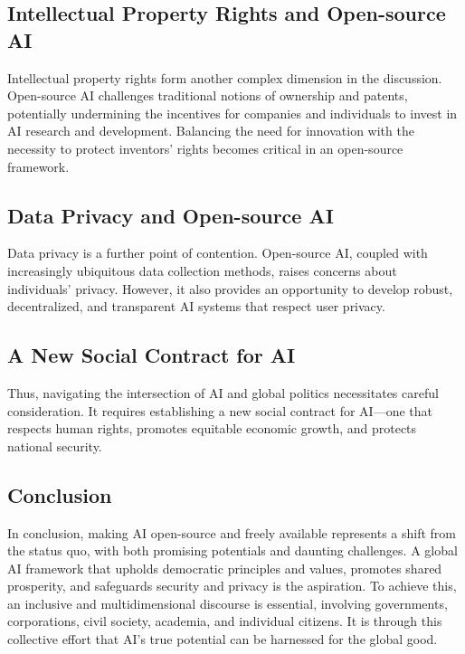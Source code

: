 \subsection{Intellectual Property Rights and Open-source AI}
Intellectual property rights form another complex dimension in the discussion. Open-source AI challenges traditional notions of ownership and patents, potentially undermining the incentives for companies and individuals to invest in AI research and development. Balancing the need for innovation with the necessity to protect inventors' rights becomes critical in an open-source framework.

\subsection{Data Privacy and Open-source AI}
Data privacy is a further point of contention. Open-source AI, coupled with increasingly ubiquitous data collection methods, raises concerns about individuals' privacy. However, it also provides an opportunity to develop robust, decentralized, and transparent AI systems that respect user privacy.

\subsection{A New Social Contract for AI}
Thus, navigating the intersection of AI and global politics necessitates careful consideration. It requires establishing a new social contract for AI—one that respects human rights, promotes equitable economic growth, and protects national security.

\subsection{Conclusion}
In conclusion, making AI open-source and freely available represents a shift from the status quo, with both promising potentials and daunting challenges. A global AI framework that upholds democratic principles and values, promotes shared prosperity, and safeguards security and privacy is the aspiration. To achieve this, an inclusive and multidimensional discourse is essential, involving governments, corporations, civil society, academia, and individual citizens. It is through this collective effort that AI's true potential can be harnessed for the global good.
